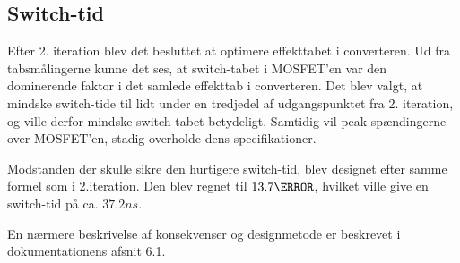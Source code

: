 
\subsection{Switch-tid}
Efter 2. iteration blev det besluttet at optimere effekttabet i converteren. Ud fra tabsmålingerne kunne det ses, at switch-tabet i MOSFET'en var den dominerende faktor i det samlede effekttab i converteren. Det blev valgt, at mindske switch-tide til lidt under en tredjedel af udgangspunktet fra 2. iteration, og ville derfor mindske switch-tabet betydeligt. Samtidig vil peak-spændingerne over MOSFET'en, stadig overholde dens specifikationer. 

Modstanden der skulle sikre den hurtigere switch-tid, blev designet efter samme formel som i 2.iteration. Den blev regnet til $13.7\ohm$, hvilket ville give en switch-tid på ca. $37.2ns$. 

En nærmere beskrivelse af konsekvenser og designmetode er beskrevet i dokumentationens afsnit 6.1.